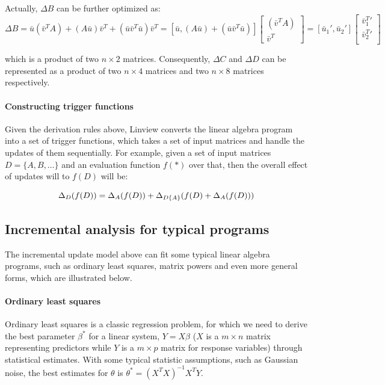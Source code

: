Actually, $\Delta B$ can be further optimized as:
\begin{equation}\label{eq: update_b_product_opt}
\Delta B = \bar{u}(\bar{v}^TA) + (A\bar{u})\bar{v}^T + (\bar{u}\bar{v}^T\bar{u})\bar{v}^T=[\bar{u}, (A\bar{u}) + (\bar{u}\bar{v}^T\bar{u})]
\begin{bmatrix}
    (\bar{v}^TA)  \\
    \bar{v}^T 
\end{bmatrix}
=[\bar{u}_1', \bar{u}_2']
\begin{bmatrix}
    \bar{v}^T_1'  \\
    \bar{v}^T_2'  \\
\end{bmatrix}
\end{equation}

which is a product of two $n \times 2$ matrices. Consequently, $\Delta C$ and $\Delta D$ can be represented as a product of two $n \times 4$ matrices and two $n \times 8$ matrices respectively.

\paragraph{Constructing trigger functions}
Given the derivation rules above, Linview converts the linear algebra program into a set of trigger functions, which takes a set of input matrices and handle the updates of them sequentially. For example, given a set of input matrices $D=\{A, B, \dots\}$ and an evaluation function $f(*)$ over that, then the overall effect of updates will to $f(D)$ will be:

\begin{equation}\label{eq: updates_by_multi_vars}
\Delta_{D}(f(D)) = \Delta_{A}(f(D)) + \Delta_{D\\\{A\}}(f(D) + \Delta_{A}(f(D)))
\end{equation}



\subsection{Incremental analysis for typical programs}
The incremental update model above can fit some typical linear algebra programs, such as ordinary least squares, matrix powers and even more general forms, which are illustrated below.

\paragraph{Ordinary least squares}
Ordinary least squares is a classic regression problem, for which we need to derive the best parameter $\beta^*$ for a linear system, $Y = X\beta$ ($X$ is a $m \times n$ matrix representing predictors while $Y$ is a $m \times p$ matrix for response variables) through statistical estimates. With some typical statistic assumptions, such as Gaussian noise, the best estimates for $\theta$ is $\theta^* = (X^TX)^{-1}X^TY$.

